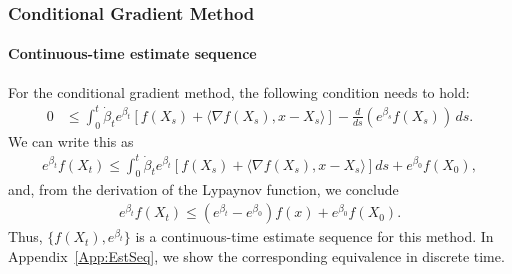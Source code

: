 \documentclass[11pt]{article}
\theoremstyle{plain}
\begin{document}
%
%
%
\subsubsection{Conditional Gradient Method} 
\paragraph{Continuous-time estimate sequence}
For the conditional gradient method, the following condition needs to hold:
\begin{align}\label{Eq:InEq4}
0 &\leq \int_0^t\dot \beta_t e^{\beta_t}  [f(X_s)+ \langle \nabla f(X_s), x - X_s \rangle] -  \frac{d}{ds}\left( e^{ \beta_s}  f(X_s)\right)\,ds.
\end{align}
 We can write this as
\begin{align*}
e^{ \beta_t}  f(X_t) \leq \int_0^t\dot \beta_t e^{\beta_t}  [f(X_s)+ \langle \nabla f(X_s), x - X_s \rangle]ds   + e^{\beta_0} f(X_0),
\end{align*}
and, from the derivation of the Lypaynov function, we conclude
\begin{align*}
e^{\beta_t} f(X_t) \leq  (e^{\beta_t} - e^{\beta_0}) f(x) + e^{\beta_0}f(X_0).
\end{align*}
Thus, $\{f(X_t),e^{\beta_t}\}$ is a continuous-time estimate sequence for this method. In Appendix~\ref{App:EstSeq}, we show the corresponding equivalence in discrete time.
%

%
%
\end{document}
